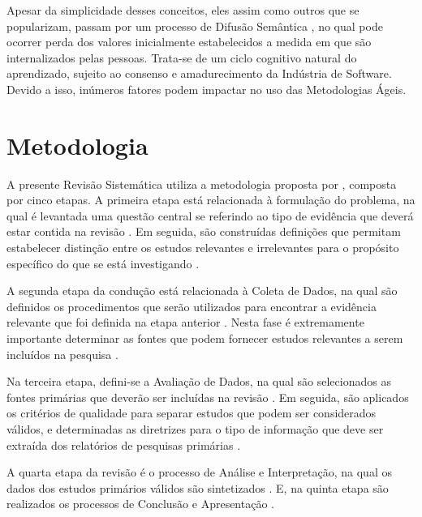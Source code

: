 Apesar da simplicidade desses conceitos, eles assim como outros que se popularizam, passam por um processo de Difusão Semântica \cite{sematicDiffusion}, no qual pode ocorrer perda dos valores inicialmente estabelecidos a medida em que são internalizados pelas pessoas. Trata-se de um ciclo cognitivo natural do aprendizado, sujeito ao consenso e amadurecimento  da Indústria de Software. Devido a isso, inúmeros fatores podem impactar no uso das Metodologias Ágeis.

\section{Metodologia}

A presente Revisão Sistemática utiliza a metodologia proposta por \citeauthor{biolchini2005techincal} \citeyear{biolchini2005techincal}, composta por cinco etapas.
A primeira etapa está relacionada à formulação do problema, na qual é levantada uma questão central se referindo ao tipo de evidência que deverá  estar contida na revisão \citeauthor{biolchini2005techincal} \citeyear{biolchini2005techincal}. Em seguida, são construídas definições que permitam estabelecer distinção entre os estudos relevantes e irrelevantes para o propósito específico do que se está investigando \citeauthor{biolchini2005techincal} \citeyear{biolchini2005techincal}.

A segunda etapa da condução está relacionada à Coleta de Dados, na qual são definidos os procedimentos que serão utilizados para encontrar a evidência relevante que foi definida na etapa anterior \citeauthor{biolchini2005techincal} \citeyear{biolchini2005techincal}. Nesta fase é extremamente importante determinar as fontes que podem fornecer estudos relevantes a serem incluídos na pesquisa \citeauthor{biolchini2005techincal} \citeyear{biolchini2005techincal}.

Na terceira etapa, defini-se a Avaliação de Dados, na qual são selecionados as fontes primárias que deverão ser incluídas na revisão \citeauthor{biolchini2005techincal} \citeyear{biolchini2005techincal}. Em seguida,  são aplicados os critérios de qualidade para separar estudos que podem ser considerados válidos, e determinadas as diretrizes para o tipo de informação que deve ser extraída dos relatórios de pesquisas primárias \citeauthor{biolchini2005techincal} \citeyear{biolchini2005techincal}.

A quarta etapa da revisão é o processo de Análise e Interpretação, na qual os dados dos estudos primários válidos são sintetizados \citeauthor{biolchini2005techincal} \citeyear{biolchini2005techincal}. E, na quinta etapa são realizados os processos de Conclusão e Apresentação \citeauthor{biolchini2005techincal} \citeyear{biolchini2005techincal}.

